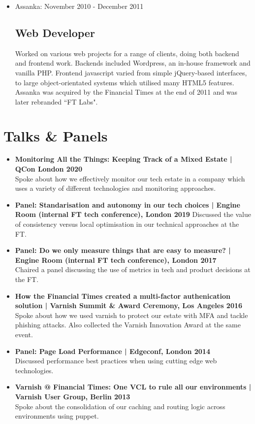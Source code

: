 \documentclass[a4paper]{article}
\begin{document}
\begin{itemize}
\item Assanka: November 2010 - December 2011
\subsection*{Web Developer}
Worked on various web projects for a range of clients, doing both backend and frontend work. Backends included Wordpress, an in-house framework and vanilla PHP. Frontend javascript varied from simple jQuery-based interfaces, to large object-orientated systems which utilised many HTML5 features.
Assanka was acquired by the Financial Times at the end of 2011 and was later rebranded ``FT Labs".

\end{itemize}

\section*{Talks \& Panels}
\begin{itemize}

\item{\bf Monitoring All the Things: Keeping Track of a Mixed Estate | QCon London 2020}\\
Spoke about how we effectively monitor our tech estate in a company which uses a variety of different technologies and monitoring approaches.
\item{\bf Panel: Standarisation and autonomy in our tech choices | Engine Room (internal FT tech conference), London 2019}
Discussed the value of consistency versus local optimisation in our technical approaches at the FT.
\item{\bf Panel: Do we only measure things that are easy to measure? | Engine Room (internal FT tech conference), London 2017}\\
Chaired a panel discussing the use of metrics in tech and product decisions at the FT.
\item{\bf How the Financial Times created a multi-factor authenication solution | Varnish Summit \& Award Ceremony, Los Angeles 2016}
Spoke about how we used varnish to protect our estate with MFA and tackle phishing attacks.  Also collected the Varnish Innovation Award at the same event.
\item{\bf Panel: Page Load Performance | Edgeconf, London 2014 }\\
Discussed performance best practices when using cutting edge web technologies.
\item{\bf Varnish @ Financial Times: One VCL to rule all our environments | Varnish User Group, Berlin 2013}\\
Spoke about the consolidation of our caching and routing logic across environments using puppet.
\end{itemize}
\end{document}
